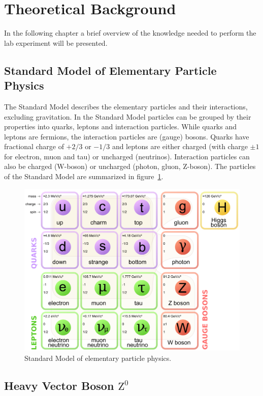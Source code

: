 \documentclass[11pt, a4paper]{article}
\numberwithin{equation}{section}
\begin{document}
\section{Theoretical Background}

In the following chapter a brief overview of the knowledge needed to perform the lab experiment will be presented.

\subsection{Standard Model of Elementary Particle Physics}

The Standard Model describes the elementary particles and their interactions, excluding gravitation.
In the Standard Model particles can be grouped by their properties into quarks, leptons and interaction particles.
While quarks and leptons are fermions, the interaction particles are (gauge) bosons.
Quarks have fractional charge of $+2/3$ or $-1/3$ and leptons are either charged (with charge $\pm1$ for electron, muon and tau) or uncharged (neutrinos).
Interaction particles can also be charged (W-boson) or uncharged (photon, gluon, Z-boson).
The particles of the Standard Model are summarized in figure~\ref{fig:standard_model}.
\begin{figure}[h]
	\centering
	\includegraphics[width=.75\textwidth]{./figures/theory/standardmodel}
	\caption{Standard Model of elementary particle physics\protect\footnotemark.}
	\label{fig:standard_model}
\end{figure}

\subsection{Heavy Vector Boson $\mathrm{Z}^0$}
\end{document}
